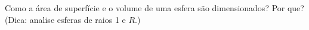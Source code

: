 Como a área de superfície e o volume de uma esfera são dimensionados? Por que? (Dica: analise esferas de raios 1 e $R$.)

